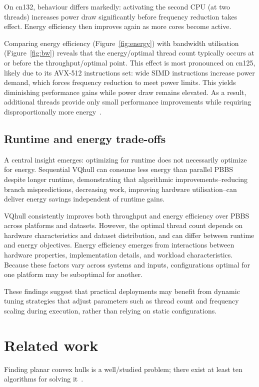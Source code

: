On cn132, behaviour differs markedly: activating the second CPU (at two threads) increases power draw significantly before frequency reduction takes effect.
Energy efficiency then improves again as more cores become active.

Comparing energy efficiency (Figure~\ref{fig:energy}) with bandwidth utilisation (Figure~\ref{fig:bw}) reveals that the energy\-/optimal thread count typically occurs at or before the throughput\-/optimal point.
This effect is most pronounced on cn125, likely due to its AVX-512 instructions set: wide SIMD instructions increase power demand, which forces frequency reduction to meet power limits.
This yields diminishing performance gains while power draw remains elevated.
As a result, additional threads provide only small performance improvements while requiring disproportionally more energy~\cite{gottschlag2021fair}.

\subsection{Runtime and energy trade-offs}
A central insight emerges: optimizing for runtime does not necessarily optimize for energy.
Sequential VQhull can consume less energy than parallel PBBS despite longer runtime, demonstrating that algorithmic improvements\---reducing branch mispredictions, decreasing work, improving hardware utilisation\---can deliver energy savings independent of runtime gains.

VQhull consistently improves both throughput and energy efficiency over PBBS across platforms and datasets.
However, the optimal thread count depends on hardware characteristics and dataset distribution, and can differ between runtime and energy objectives.
Energy efficiency emerges from interactions between hardware properties, implementation details, and workload characteristics.
Because these factors vary across systems and inputs, configurations optimal for one platform may be suboptimal for another.

These findings suggest that practical deployments may benefit from dynamic tuning strategies that adjust parameters such as thread count and frequency scaling during execution, rather than relying on static configurations.

\section{Related work}\label{sec:related}
Finding planar convex hulls is a well\-/studied problem; there exist at least ten algorithms for solving it~\cite{graham1972efficient,jarvis1973identification,eddy1977convex,preparata1977convex,bykat1978convex,akl1978fast,andrew1979another,clarkson1993four,barber1996quick,chan1996optimal}.

